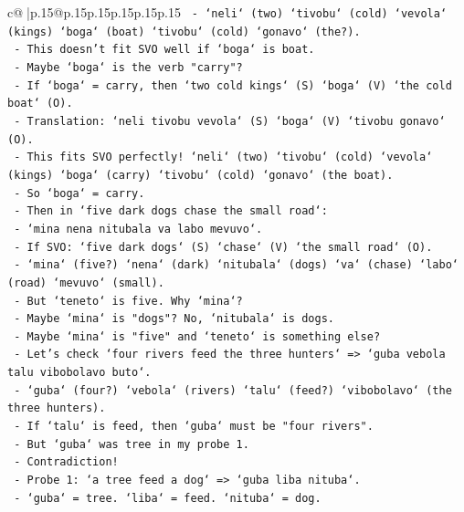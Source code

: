 \documentclass{article}
\begin{document}
{\begin{supertabular}{c@{$\;$}|p{.15\linewidth}@{}p{.15\linewidth}p{.15\linewidth}p{.15\linewidth}p{.15\linewidth}p{.15\linewidth}}
{{{\texttt{             {-} `neli` (two) `tivobu` (cold) `vevola` (kings) `boga` (boat) `tivobu` (cold) `gonavo` (the?).} \\
\texttt{             {-} This doesn't fit SVO well if `boga` is boat.} \\
\texttt{             {-} Maybe `boga` is the verb "carry"?} \\
\texttt{             {-} If `boga` = carry, then `two cold kings` (S) `boga` (V) `the cold boat` (O).} \\
\texttt{             {-} Translation: `neli tivobu vevola` (S) `boga` (V) `tivobu gonavo` (O).} \\
\texttt{             {-} This fits SVO perfectly! `neli` (two) `tivobu` (cold) `vevola` (kings) `boga` (carry) `tivobu` (cold) `gonavo` (the boat).} \\
\texttt{             {-} So `boga` = carry.} \\
\texttt{             {-} Then in `five dark dogs chase the small road`:} \\
\texttt{               {-} `mina nena nitubala va labo mevuvo`.} \\
\texttt{               {-} If SVO: `five dark dogs` (S) `chase` (V) `the small road` (O).} \\
\texttt{               {-} `mina` (five?) `nena` (dark) `nitubala` (dogs) `va` (chase) `labo` (road) `mevuvo` (small).} \\
\texttt{               {-} But `teneto` is five. Why `mina`?} \\
\texttt{               {-} Maybe `mina` is "dogs"? No, `nitubala` is dogs.} \\
\texttt{               {-} Maybe `mina` is "five" and `teneto` is something else?} \\
\texttt{               {-} Let's check `four rivers feed the three hunters` => `guba vebola talu vibobolavo buto`.} \\
\texttt{                 {-} `guba` (four?) `vebola` (rivers) `talu` (feed?) `vibobolavo` (the three hunters).} \\
\texttt{                 {-} If `talu` is feed, then `guba` must be "four rivers".} \\
\texttt{                 {-} But `guba` was tree in my probe 1.} \\
\texttt{                 {-} Contradiction!} \\
\texttt{                 {-} Probe 1: `a tree feed a dog` => `guba liba nituba`.} \\
\texttt{                   {-} `guba` = tree. `liba` = feed. `nituba` = dog.} \\
}}}
\end{supertabular}}
\end{document}
